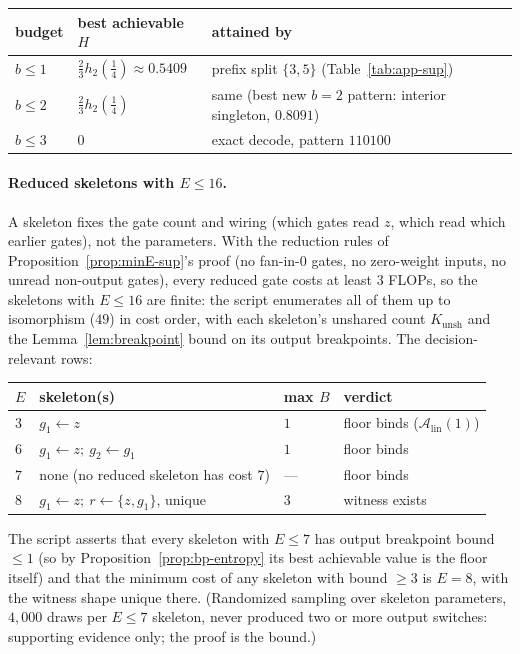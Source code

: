 \documentclass[twocolumn,10pt]{article}
\theoremstyle{definition}
\theoremstyle{remark}
\newcommand{\cA}{\mathcal{A}}
\newcommand{\Alin}{\cA_{\mathrm{lin}}}
\newcommand{\hb}{h_2}
\newcommand{\Kunsh}{K_{\mathrm{unsh}}}
\begin{document}
\begin{center}
\footnotesize
\begin{tabular}{lll}
\toprule
budget & best achievable $H$ & attained by \\
\midrule
$b \le 1$ & $\tfrac23 \hb(\tfrac14) \approx 0.5409$ &
prefix split $\{3,5\}$ (Table~\ref{tab:app-sup}) \\
$b \le 2$ & $\tfrac23 \hb(\tfrac14)$ &
same (best new $b{=}2$ pattern: interior singleton, $0.8091$) \\
$b \le 3$ & $0$ & exact decode, pattern $110100$ \\
\bottomrule
\end{tabular}
\end{center}

\paragraph{Reduced skeletons with $E \le 16$.} A skeleton fixes the
gate count and wiring (which gates read $z$, which read which earlier
gates), not the parameters. With the reduction rules of
Proposition~\ref{prop:minE-sup}'s proof (no fan-in-0 gates, no
zero-weight inputs, no unread non-output gates), every reduced gate
costs at least $3$ FLOPs, so the skeletons with $E \le 16$ are finite:
the script enumerates all of them up to isomorphism ($49$) in
cost order, with each skeleton's unshared count $\Kunsh$ and the
Lemma~\ref{lem:breakpoint} bound on its output breakpoints. The
decision-relevant rows:

\begin{center}
\footnotesize
\begin{tabular}{llll}
\toprule
$E$ & skeleton(s) & max $B$ & verdict \\
\midrule
$3$ & $g_1 \!\leftarrow\! z$ & $1$ & floor binds ($\Alin(1)$) \\
$6$ & $g_1 \!\leftarrow\! z;\ g_2 \!\leftarrow\! g_1$ & $1$ &
floor binds \\
$7$ & none (no reduced skeleton has cost $7$) & --- & floor binds \\
$8$ & $g_1 \!\leftarrow\! z;\ r \!\leftarrow\! \{z, g_1\}$, unique & $3$ &
witness exists \\
\bottomrule
\end{tabular}
\end{center}

\noindent The script asserts that every skeleton with $E \le 7$ has
output breakpoint bound $\le 1$ (so by
Proposition~\ref{prop:bp-entropy} its best achievable value is the
floor itself) and that the minimum cost of any skeleton with bound
$\ge 3$ is $E = 8$, with the witness shape unique there. (Randomized
sampling over skeleton parameters, $4{,}000$ draws per $E \le 7$
skeleton, never produced two or more output switches: supporting
evidence only; the proof is the bound.)
\end{document}
